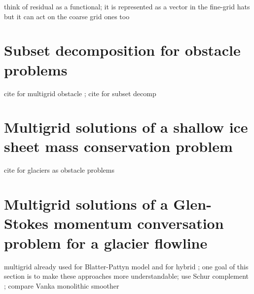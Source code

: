 \documentclass[letterpaper,final,12pt,reqno]{amsart}
\begin{document}
think of residual as a functional; it is represented as a vector in the fine-grid hats but it can act on the coarse grid ones too


\section{Subset decomposition for obstacle problems} \label{sec:obstacle}


cite for multigrid obstacle \cite{BrandtCryer1983,Bueler2021,GraeserKornhuber2009,Jouvetetal2013}; cite for subset decomp \cite{Tai2003}

\section{Multigrid solutions of a shallow ice sheet mass conservation problem} \label{sec:sia}

cite for glaciers as obstacle problems \cite{Bueler2016,Bueler2020,Calvoetal2002,JouvetBueler2012}

\section{Multigrid solutions of a Glen-Stokes momentum conversation problem for a glacier flowline} \label{sec:stokes}

multigrid already used for Blatter-Pattyn model \cite{BrownSmithAhmadia2013} and for hybrid \cite{Jouvetetal2013}; one goal of this section is to make these approaches more understandable; use Schur complement \cite{Bueler2021,Elmanetal2014}; compare Vanka monolithic smoother \cite{Farrelletal2019}

\small

\bigskip


\end{document}
